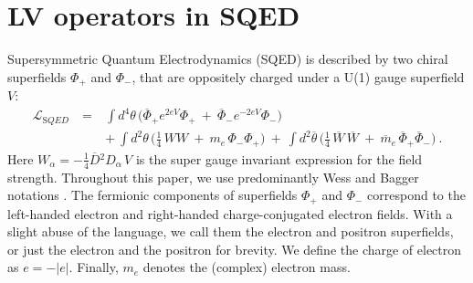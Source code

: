 \documentclass[12pt]{revtex4}
\begin{document}
\section{LV operators in SQED} 
\label{LVoperators}


Supersymmetric Quantum Electrodynamics (SQED) is described
by two chiral superfields $ \Phi_+ $ and $ \Phi_- $, that 
are oppositely charged under a U(1) gauge superfield $ V $: 
\begin{eqnarray}
\mathcal{L}_{\mathrm SQED} & ~=~
&
\int d^4\theta\, \Big(
   \overline{\Phi}_+ e^{2eV} \Phi_+ ~+~
   \overline{\Phi}_- e^{-2eV} {\Phi}_-  \Big) \\
\label{SQED}
&& +~   
\int d^2\theta\, \Big( \frac{1}{4}\,  WW ~+~m_e\, \Phi_-\Phi_+ \Big) ~+~
\int d^2\overline{\theta}\, 
\Big( \frac{1}{4}\, \overline{W}\,\overline{W} ~+~ 
\overline{m}_e\, \overline{\Phi}_+\overline{\Phi}_- \Big)~.
\nonumber
\end{eqnarray}
%
Here $ W_\alpha = - \frac{1}{4} \overline{D}{}^2 D_\alpha\, {V} $ 
is the super gauge invariant expression for the field strength. 
Throughout this paper, we use predominantly Wess and
Bagger notations \cite{Wess:1992cp}. The fermionic components of
superfields $ \Phi_+ $ and $ \Phi_- $ correspond to the left-handed
electron and right-handed charge-conjugated electron fields. With a   
slight abuse of the language, we call them the electron and positron 
superfields, or just the electron and the positron for brevity. We
define the charge of electron as $ e = - | e | $. 
Finally, $m_e$ denotes the (complex) electron mass. 
\end{document}
